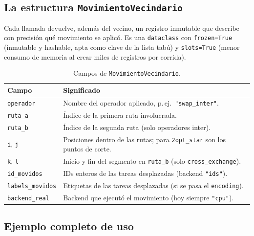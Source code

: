 \documentclass[11pt,a4paper]{article}
\theoremstyle{definition}
\theoremstyle{remark}
\begin{document}
\subsection{La estructura \texttt{MovimientoVecindario}}
\label{subsec:movimiento}

Cada llamada devuelve, además del vecino, un registro inmutable que
describe con precisión qué movimiento se aplicó. Es una \texttt{dataclass}
con \texttt{frozen=True} (inmutable y hashable, apta como clave de la lista
tabú) y \texttt{slots=True} (menor consumo de memoria al crear miles de
registros por corrida).

\begin{table}[h]
\centering
\caption{Campos de \texttt{MovimientoVecindario}.}
\label{tab:movimiento}
\small
\begin{tabular}{lp{9.5cm}}
\toprule
Campo & Significado \\
\midrule
\texttt{operador}        & Nombre del operador aplicado, p.\,ej.\ \texttt{"swap\_inter"}. \\
\texttt{ruta\_a}         & Índice de la primera ruta involucrada. \\
\texttt{ruta\_b}         & Índice de la segunda ruta (solo operadores inter). \\
\texttt{i}, \texttt{j}   & Posiciones dentro de las rutas; para \texttt{2opt\_star} son los puntos de corte. \\
\texttt{k}, \texttt{l}   & Inicio y fin del segmento en \texttt{ruta\_b} (solo \texttt{cross\_exchange}). \\
\texttt{id\_movidos}     & IDs enteros de las tareas desplazadas (backend \texttt{"ids"}). \\
\texttt{labels\_movidos} & Etiquetas de las tareas desplazadas (si se pasa el \texttt{encoding}). \\
\texttt{backend\_real}   & Backend que ejecutó el movimiento (hoy siempre \texttt{"cpu"}). \\
\bottomrule
\end{tabular}
\end{table}

\subsection{Ejemplo completo de uso}
\label{subsec:ejemplo-vecino}
\end{document}
